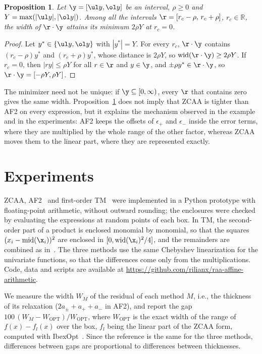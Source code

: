\documentclass[10pt]{article}
\newcommand{\Rset}{\mathbb{R}}
\newcommand{\midp}{\mathrm{mid}}
\renewcommand{\wid}{\mathrm{wid}}
\newtheorem{propo}{Proposition}
\begin{document}
\begin{propo}
\label{prop:center}
Let $\y=[\ul y,\ol y]$ be an interval, $\rho\ge 0$ and $Y=\max(|\ul y|,|\ol y|)$. Among all the intervals $\r=[r_c-\rho,\,r_c+\rho]$, $r_c\in\Rset$, the width of $\r\cdot\y$ attains its minimum $2\rho Y$ at $r_c=0$.
\end{propo}

\begin{proof}
Let $y^*\in\{\ul y,\ol y\}$ with $|y^*|=Y$. For every $r_c$, $\r\cdot\y$ contains $(r_c-\rho)y^*$ and $(r_c+\rho)y^*$, whose distance is $2\rho Y$, so $\wid(\r\cdot\y)\ge 2\rho Y$. If $r_c=0$, then $|ry|\le\rho Y$ for all $r\in\r$ and $y\in\y$, and $\pm\rho y^*\in\r\cdot\y$, so $\r\cdot\y=[-\rho Y,\rho Y]$.
\end{proof}

The minimizer need not be unique: if $\y\subseteq[0,\infty)$, every $\r$ that contains zero gives the same width. Proposition~\ref{prop:center} does not imply that ZCAA is tighter than AF2 on every expression, but it explains the mechanism observed in the example and in the experiments: AF2 keeps the offsets of $\epsilon_+$ and $\epsilon_-$ inside the error terms, where they are multiplied by the whole range of the other factor, whereas ZCAA moves them to the linear part, where they are represented exactly.

\section{Experiments}
\label{sec:experiments}

ZCAA, AF2~\cite{messine2002extentions} and first-order TM~\cite{makino2003} were implemented in a Python prototype with floating-point arithmetic, without outward rounding; the enclosures were checked by evaluating the expressions at random points of each box. In TM, the second-order part of a product is enclosed monomial by monomial, so that the squares $(x_i-\midp(\x_i))^2$ are enclosed in $[0,\wid(\x_i)^2/4]$, and the remainders are combined as in~\cite[Def.~2]{makino2003}. The three methods use the same Chebyshev linearization for the univariate functions, so that the differences come only from the multiplications. Code, data and scripts are available at \url{https://github.com/rilianx/raa-affine-arithmetic}.

We measure the width $W_M$ of the residual of each method $M$, i.e., the thickness of its relaxation ($2a_\pm+a_++a_-$ in AF2), and report the gap $100\,(W_M-W_{\mathrm{OPT}})/W_{\mathrm{OPT}}$, where $W_{\mathrm{OPT}}$ is the exact width of the range of $f(x)-f_l(x)$ over the box, $f_l$ being the linear part of the ZCAA form, computed with IbexOpt~\cite{chabert2009}. Since the reference is the same for the three methods, differences between gaps are proportional to differences between thicknesses.
\end{document}
